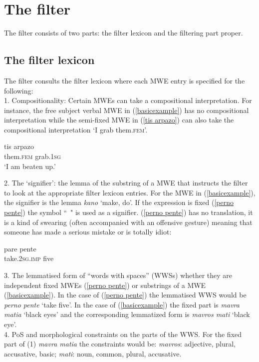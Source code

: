 \documentclass[output=paper,
modfonts
]{langscibook}
\begin{document}
\section{The filter}
Τhe filter consists of two parts: the filter lexicon and the filtering part proper. 

\subsection{The filter lexicon}
The filter consults the filter lexicon where each MWE entry is specified for the following: \\

1. Compositionality: Certain MWEs can take a compositional interpretation. For instance, the free subject verbal MWE in (\ref{basicexample}) has no compositional interpretation while the semi-fixed MWE in (\ref{tis arpazo}) can also take the compositional interpretation `I grab them.\textsc{fem}’. 

\ea\label{tis arpazo}
\gll tis                  arpazo\\
them.\textsc{fem} grab.\textsc{1sg}\\
\glt `I am beaten up.’
\z

2. The ‘signifier’: the lemma of the substring of a MWE that instructs the filter to look at the appropriate filter lexicon entries. For the MWE in (\ref{basicexample}), the signifier is the lemma \textit{kano} `make, do'. If the expression is fixed (\ref{perno pente}) the symbol ``~" is used as a signifier.  (\ref{perno pente}) has no translation, it is a kind of swearing (often accompanied with an offensive gesture) meaning that someone has made a serious mistake or is totally idiot:
  
 \ea\label{perno pente}
\gll pare pente\\
take.\textsc{2sg}.\textsc{imp} five\\ 
\z

3. The lemmatised form of  ``words with spaces'' (WWSs) whether they are independent fixed MWEs (\ref{perno pente}) or substrings of a MWE (\ref{basicexample}). In the case of (\ref{perno pente}) the lemmatised WWS would be \textit{perno pente} `take five'. In the case of (\ref{basicexample}) the fixed part is \textit{mavra matia} `black eyes' and the corresponding lemmatized form is \textit{mavros mati} `black eye'.\\

4. PoS and morphological constraints on the parts of the WWS. For the fixed part of (1) \textit{mavra matia} the constraints would be: \textit{mavros}: adjective, plural, accusative, basic; \textit{mati}: noun, common, plural, accusative. 
\end{document}

